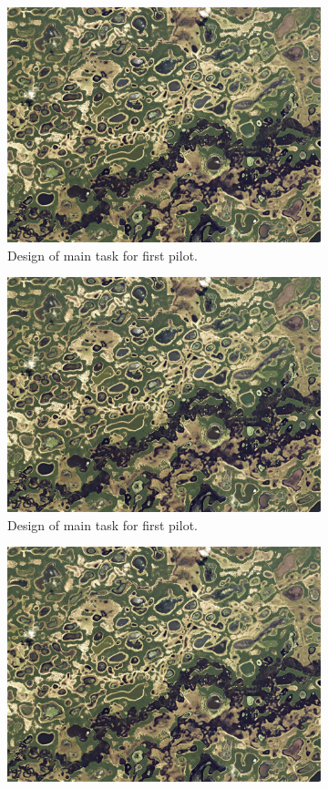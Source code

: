 \begin{figure}[h]
\begin{subfigure}{0.5\textwidth}
  \centering
  \includegraphics[width=.8\linewidth]{pantanal.jpeg}  
  \caption{Design of main task for first pilot.}
  \label{v2.requirement.examples.1}
\end{subfigure}
\begin{subfigure}{0.5\textwidth}
  \centering
  \includegraphics[width=.8\linewidth]{pantanal.jpeg}  
  \caption{Design of main task for first pilot.}
  \label{v2.requirement.examples.2}
\end{subfigure}
\newline
\begin{subfigure}{0.5\textwidth}
  \centering
  \includegraphics[width=.8\linewidth]{pantanal.jpeg}  

\end{subfigure}
\end{figure}
